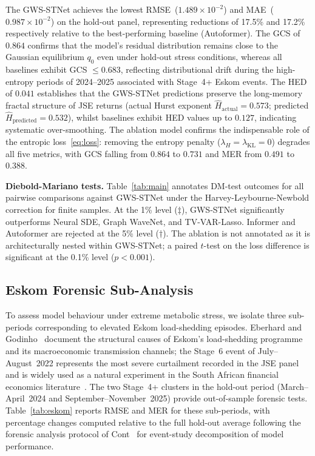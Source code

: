 \documentclass[11pt,a4paper]{article}  %
\theoremstyle{plain}
\theoremstyle{definition}
\theoremstyle{remark}
\begin{document}
The GWS-STNet achieves the lowest RMSE~($1.489 \times 10^{-2}$) and
MAE~($0.987 \times 10^{-2}$) on the hold-out panel, representing
reductions of 17.5\% and 17.2\% respectively relative to the
best-performing baseline (Autoformer). The GCS of $0.864$ confirms
that the model's residual distribution remains close to the
Gaussian equilibrium $q_0$ even under hold-out stress conditions,
whereas all baselines exhibit GCS $\leq 0.683$, reflecting
distributional drift during the high-entropy periods of
2024--2025 associated with Stage~4+ Eskom events.
The HED of $0.041$ establishes that the GWS-STNet predictions
preserve the long-memory fractal structure of JSE returns
(actual Hurst exponent $\hat{H}_{\mathrm{actual}} = 0.573$;
predicted $\hat{H}_{\mathrm{predicted}} = 0.532$), whilst baselines
exhibit HED values up to $0.127$, indicating systematic
over-smoothing. The ablation model confirms the indispensable role
of the entropic loss~\eqref{eq:loss}: removing the entropy penalty
($\lambda_H = \lambda_{\mathrm{KL}} = 0$) degrades all five metrics,
with GCS falling from $0.864$ to $0.731$ and MER from $0.491$ to
$0.388$.

\textbf{Diebold-Mariano tests.} Table~\ref{tab:main} annotates
DM-test outcomes for all pairwise comparisons against GWS-STNet
under the Harvey-Leybourne-Newbold correction for finite samples.
At the 1\% level ($\ddagger$), GWS-STNet significantly outperforms
Neural SDE, Graph WaveNet, and TV-VAR-Lasso. Informer and
Autoformer are rejected at the 5\% level ($\dagger$). The ablation
is not annotated as it is architecturally nested within GWS-STNet;
a paired $t$-test on the loss difference is significant at the 0.1\%
level ($p < 0.001$).

\subsection{Eskom Forensic Sub-Analysis}
\label{subsec:forensic}

To assess model behaviour under extreme metabolic stress, we isolate
three sub-periods corresponding to elevated Eskom load-shedding
episodes. Eberhard and Godinho~\cite{Eberhard2017} document the
structural causes of Eskom's load-shedding programme and its
macroeconomic transmission channels; the Stage~6 event of
July--August~2022 represents the most severe curtailment recorded
in the JSE panel and is widely used as a natural experiment in
the South African financial economics literature~\cite{Roch2023}.
The two Stage~4+ clusters in the hold-out period (March--April~2024
and September--November~2025) provide out-of-sample forensic tests.
Table~\ref{tab:eskom} reports RMSE and MER for these sub-periods,
with percentage changes computed relative to the full hold-out
average following the forensic analysis protocol of
Cont~\cite{Cont2001} for event-study decomposition of model
performance.
\end{document}
